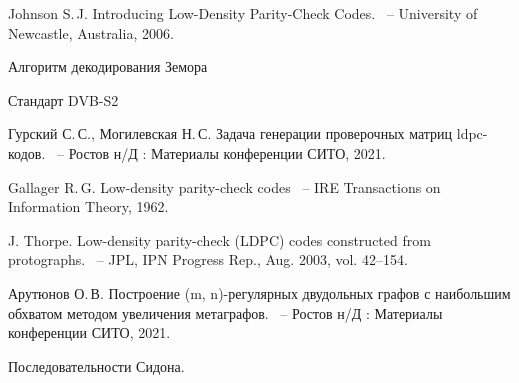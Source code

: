 \documentclass[14pt]{mmcs_article}
\begin{document}
\begin{thebibliography}{0}

Johnson S.\,J.
Introducing Low-Density Parity-Check Codes.
~-- University of Newcastle, Australia, 2006.

Алгоритм декодирования Земора

Стандарт DVB-S2

Гурский С.\,С., Могилевская Н.\,С.
Задача генерации проверочных матриц ldpc-кодов.
~-- Ростов н/Д : Материалы конференции СИТО, 2021.

Gallager R.\,G. 
Low-density parity-check codes
~-- IRE Transactions on Information Theory, 1962.

J. Thorpe. 
Low-density parity-check (LDPC) codes constructed from protographs.
~-- JPL, IPN Progress Rep., Aug. 2003, vol. 42–154.


Арутюнов О.\,В.
Построение (m, n)-регулярных двудольных графов с наибольшим обхватом методом увеличения метаграфов.
~-- Ростов н/Д : Материалы конференции СИТО, 2021.

Последовательности Сидона.


\end{thebibliography}
\end{document}
